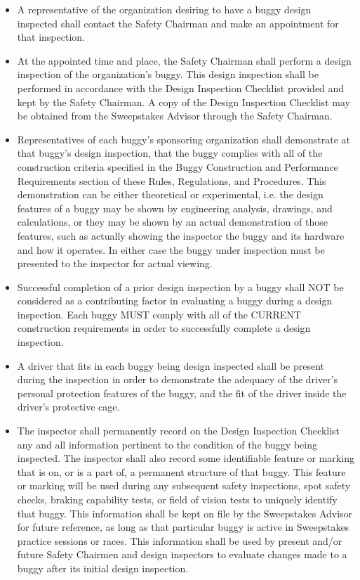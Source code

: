 	\begin{itemize}

		\item
		A representative of the organization desiring to have a buggy design inspected
		shall contact the Safety Chairman and make an appointment for that inspection.

		\item
		At the appointed time and place, the Safety Chairman shall perform a design
		inspection of the organization's buggy. This design inspection shall be
		performed in accordance with the Design Inspection Checklist provided and kept
		by the Safety Chairman. A copy of the Design Inspection Checklist may be
		obtained from the Sweepstakes Advisor through the Safety Chairman.

		\item
		Representatives of each buggy's sponsoring organization shall demonstrate at
		that buggy's design inspection, that the buggy complies with all of the
		construction criteria specified in the Buggy Construction and Performance
		Requirements section of these Rules, Regulations, and Procedures. This
		demonstration can be either theoretical or experimental, i.e. the design
		features of a buggy may be shown by engineering analysis, drawings, and
		calculations, or they may be shown by an actual demonstration of those
		features, such as actually showing the inspector the buggy and its hardware and
		how it operates. In either case the buggy under inspection must be presented to
		the inspector for actual viewing.

		\item
		Successful completion of a prior design inspection by a buggy shall NOT be
		considered as a contributing factor in evaluating a buggy during a design
		inspection. Each buggy MUST comply with all of the CURRENT construction
		requirements in order to successfully complete a design inspection.

		\item
		A driver that fits in each buggy being design inspected shall be present during
		the inspection in order to demonstrate the adequacy of the driver's personal
		protection features of the buggy, and the fit of the driver inside the driver's
		protective cage.

		\item
		The inspector shall permanently record on the Design Inspection Checklist any
		and all information pertinent to the condition of the buggy being inspected.
		The inspector shall also record some identifiable feature or marking that is
		on, or is a part of, a permanent structure of that buggy. This feature or
		marking will be used during any subsequent safety inspections, spot safety
		checks, braking capability tests, or field of vision tests to uniquely identify
		that buggy. This information shall be kept on file by the Sweepstakes Advisor
		for future reference, as long as that particular buggy is active in Sweepstakes
		practice sessions or races. This information shall be used by present and/or
		future Safety Chairmen and design inspectors to evaluate changes made to a
		buggy after its initial design inspection.

	\end{itemize}

